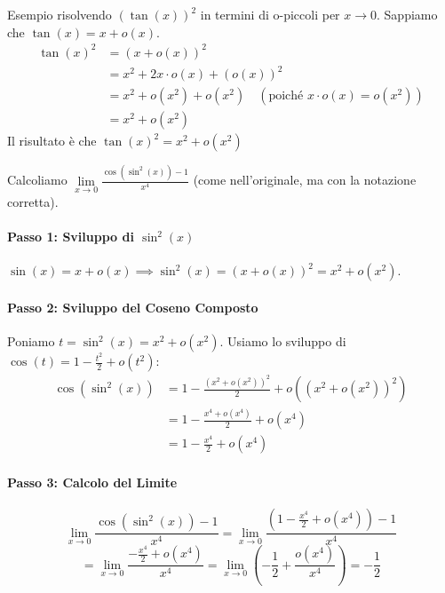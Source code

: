 \begin{example}
    Esempio risolvendo $(\tan(x))^2$ in termini di o-piccoli per $x\to 0$. Sappiamo che $\tan(x) = x + o(x)$.
    \begin{align*}
        \tan(x)^2 &= (x + o(x))^2 \\
        &= x^2 + 2x \cdot o(x) + (o(x))^2 \\
        &= x^2 + o(x^2) + o(x^2) \quad (\text{poiché } x \cdot o(x) = o(x^2)) \\
        &= x^2 + o(x^2)
    \end{align*}
    Il risultato è che $\tan(x)^2 = x^2 + o(x^2) $
\end{example}

\begin{example}
    Calcoliamo $\lim\limits_{x\to 0}\frac{\cos(\sin^2(x)) - 1}{x^4}$ (come nell'originale, ma con la notazione corretta).
    
    \paragraph{Passo 1: Sviluppo di $\sin^2(x)$}
    $\sin(x) = x + o(x) \implies \sin^2(x) = (x + o(x))^2 = x^2 + o(x^2)$.
    
    \paragraph{Passo 2: Sviluppo del Coseno Composto}
    Poniamo $t = \sin^2(x) = x^2 + o(x^2)$. Usiamo lo sviluppo di $\cos(t) = 1 - \frac{t^2}{2} + o(t^2)$:
    \begin{align*}
        \cos(\sin^2(x)) &= 1 - \frac{(x^2 + o(x^2))^2}{2} + o((x^2 + o(x^2))^2) \\
        &= 1 - \frac{x^4 + o(x^4)}{2} + o(x^4) \\
        &= 1 - \frac{x^4}{2} + o(x^4)
    \end{align*}
    
    \paragraph{Passo 3: Calcolo del Limite}
    $$ \lim\limits_{x\to 0}\frac{\cos(\sin^2(x)) - 1}{x^4} = \lim\limits_{x\to 0}\frac{\left(1 - \frac{x^4}{2} + o(x^4)\right) - 1}{x^4} $$
    $$ = \lim\limits_{x\to 0}\frac{-\frac{x^4}{2} + o(x^4)}{x^4} = \lim\limits_{x\to 0} \left(-\frac{1}{2} + \frac{o(x^4)}{x^4}\right) = -\frac{1}{2} $$
\end{example}


